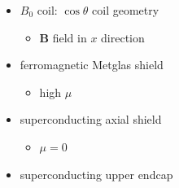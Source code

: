 \documentclass{beamer}
\renewcommand{\vec}{\mathbf}
\begin{document}
\begin{frame}
\begin{columns}
    \begin{column}{0.5\textwidth}
    \begin{itemize}
        \item $B_0$ coil: $\cos\theta$ coil geometry \pause
            \begin{itemize}
                \item $\vec{B}$ field in $x$ direction \pause
            \end{itemize}
        \bigskip
        \item ferromagnetic Metglas shield\pause
            \begin{itemize}
                \item high $\mu$ \pause
            \end{itemize}
        \item superconducting axial shield \pause
            \begin{itemize}
                \item $\mu = 0$ \pause
            \end{itemize}
        \bigskip
        \item superconducting upper endcap
    \end{itemize}
    \end{column}

    \end{columns}

\end{frame}
\end{document}
